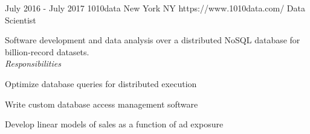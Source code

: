 \documentclass[10pt]{article}
\begin{document}
	\vspace{-15pt} %
	\job %
		{July 2016 - July 2017}
		{1010data}
		{New York NY}
		{https://www.1010data.com/}
		{Data Scientist}
		{Software development and data analysis over a distributed NoSQL database for billion-record datasets. \\

		\vspace{-7pt}
		\textit{Responsibilities}
		\begin{itemize-noindent}
			\vspace{7pt}
			\item Optimize database queries for distributed execution
			\item Write custom database access management software
			\item Develop linear models of sales as a function of ad exposure
		\end{itemize-noindent}}
\end{document}
